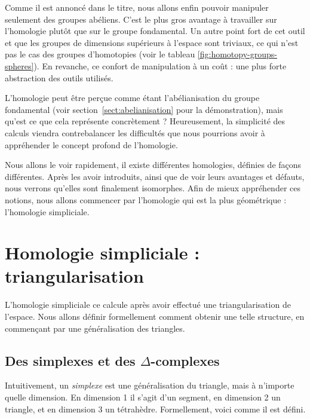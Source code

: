 
Comme il est annoncé dans le titre, nous allons enfin pouvoir manipuler seulement des groupes abéliens. C'est le plus gros avantage à travailler sur l'homologie plutôt que sur le groupe fondamental. Un autre point fort de cet outil et que les groupes de dimensions supérieurs à l'espace sont triviaux, ce qui n'est pas le cas des groupes d'homotopies (voir le tableau \ref{fig:homotopy-groups-spheres}). En revanche, ce confort de manipulation à un coût : une plus forte abstraction des outils utilisés.

L'homologie peut être perçue comme étant l'abélianisation du groupe fondamental (voir section~\ref{sect:abelianisation} pour la démonstration), mais qu'est ce que cela représente concrètement ? Heureusement, la simplicité des calculs viendra contrebalancer les difficultés que nous pourrions avoir à appréhender le concept profond de l'homologie.

\bigskip Nous allons le voir rapidement, il existe différentes homologies, définies de façons différentes. Après les avoir introduits, ainsi que de voir leurs avantages et défauts, nous verrons qu'elles sont finalement isomorphes. Afin de mieux appréhender ces notions, nous allons commencer par l'homologie qui est la plus géométrique : l'homologie simpliciale.

\section{Homologie simpliciale : triangularisation}

L'homologie simpliciale ce calcule après avoir effectué une triangularisation de l'espace. Nous allons définir formellement comment obtenir une telle structure, en commençant par une généralisation des triangles.

\subsection{Des simplexes et des $\Delta$-complexes}\label{sect:simplices}
Intuitivement, un \emph{simplexe} est une généralisation du triangle, mais à n'importe quelle dimension. En dimension 1 il s'agit d'un segment, en dimension 2 un triangle, et en dimension 3 un tétrahèdre. Formellement, voici comme il est défini.

